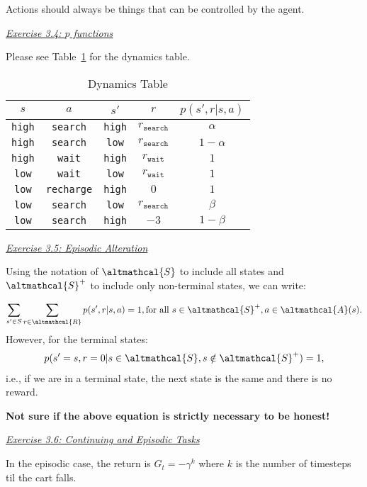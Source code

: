 \documentclass{article}
\newcommand{\myq}[1]{%
	\vspace{1em}
	\noindent\underline{\emph{Exercise #1}}\vspace{0.25em}\linebreak
}
\begin{document}
Actions should always be things that can be controlled by the agent. 

\myq{3.4: $p$ functions}
Please see Table~\ref{tab:example} for the dynamics table. 
\begin{table}[H]
	\caption{\label{tab:example}Dynamics Table}
	\begin{tabular}{cccc|c}
		$s$           & $a$             & $s'$          & $r$ & $p(s', r| s, a)$ \\ \hline
		\texttt{high} & \texttt{search} & \texttt{high} & $r_{\texttt{search}}$ &  $\alpha$                \\
		\texttt{high} & \texttt{search} & \texttt{low} & $r_{\texttt{search}}$ &     $1 - \alpha$             \\
		\texttt{high} & \texttt{wait} & \texttt{high} & $r_{\texttt{wait}}$ &     $1$             \\
		\texttt{low} & \texttt{wait} & \texttt{low} & $r_{\texttt{wait}}$ &     $1$             \\
		\texttt{low} & \texttt{recharge} & \texttt{high} & $0$ &     $1$             \\
		\texttt{low} & \texttt{search} & \texttt{low} & $r_{\texttt{search}}$ &     $\beta$             \\
		\texttt{low} & \texttt{search} & \texttt{high} & $-3$ &     $1-\beta$             \\           
	\end{tabular}
\centering
\end{table}

\myq{3.5: Episodic Alteration}
Using the notation of $\altmathcal{S}$ to include all states and $\altmathcal{S}^+$ to include only non-terminal states, we can write:

\begin{align}
\sum_{s' \in S} \sum_{r \in \altmathcal{R}} p(s', r | s, a) = 1, \text{for all } s\in \altmathcal{S}^+, a \in \altmathcal{A}(s).
\end{align}
However, for the terminal states:
\begin{align}
p(s' = s, r = 0| s \in \altmathcal{S}, s\notin \altmathcal{S}^+) = 1,
\end{align}
i.e., if we are in a terminal state, the next state is the same and there is no reward. 

\textbf{Not sure if the above equation is strictly necessary to be honest!}

\myq{3.6: Continuing and Episodic Tasks}
In the episodic case, the return is $G_t = -\gamma^k$ where $k$ is the number of timesteps til the cart falls. 
\end{document}
